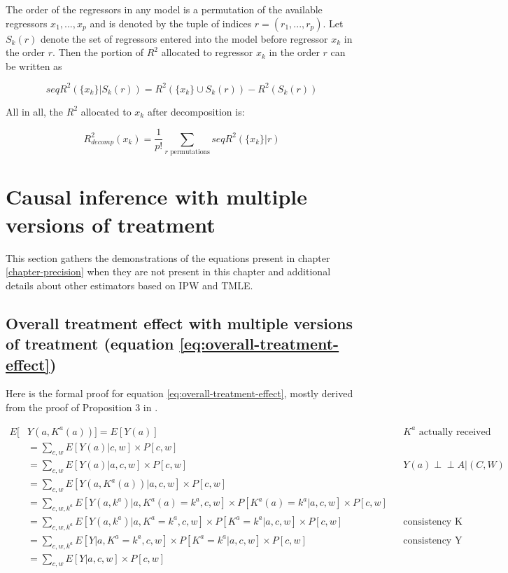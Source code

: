 \documentclass[a4paper,12pt,twoside,onecolumn,openright,final,oldfontcommands]{memoir}
\begin{document}
The order of the regressors in any model is a permutation of the
available regressors \(x_1, ..., x_p\) and is denoted by the tuple of
indices \(r = (r_1, ..., r_p)\). Let \(S_k(r)\) denote the set of
regressors entered into the model before regressor \(x_k\) in the order
\(r\). Then the portion of \(R^2\) allocated to regressor \(x_k\) in the
order \(r\) can be written as

\[seqR^2(\{x_k\}|S_k(r))=R^2(\{x_k\}\cup S_k(r))-R^2(S_k(r))\]

All in all, the \(R^2\) allocated to \(x_k\) after decomposition is:

\[R^2_{decomp}(x_k)=\dfrac{1}{p!}\sum_{r\text{ permutations}}seqR^2(\{x_k\}|r)\]

\section{Causal inference with multiple versions of
treatment}\label{causal-inference-with-multiple-versions-of-treatment}

This section gathers the demonstrations of the equations present in
chapter \ref{chapter-precision} when they are not present in this
chapter and additional details about other estimators based on IPW and
TMLE.

\subsection{Overall treatment effect with multiple versions of treatment
(equation
\eqref{eq:overall-treatment-effect})}\label{appendix-overall-treatment-effect}

Here is the formal proof for equation \eqref{eq:overall-treatment-effect},
mostly derived from the proof of Proposition 3 in
\citep{vanderweele2013causal}.

\begingroup
\footnotesize

\begin{equation*}
\begin{aligned}
  E[ & Y(a, K^a(a))] = E[Y(a)] &&K^a \text{ actually received}\\
                  & = \sum_{c,w} E[Y(a)|c,w] \times P[c,w]&& \\
                  & = \sum_{c,w} E[Y(a)|a,c,w] \times P[c,w]
                  && Y(a) \perp \!\!\! \perp A | (C,W)\\
                  & = \sum_{c,w} E[Y(a, K^a(a))|a,c,w] \times P[c,w]&& \\
                  & = \sum_{c,w,k^a} E[Y(a, k^a)|a,K^a(a)=k^a,c,w]\times P[K^a(a)=k^a|a,c,w] \times P[c,w] &&\\
                  & = \sum_{c,w,k^a} E[Y(a, k^a)|a,K^a=k^a,c,w]\times P[K^a=k^a|a,c,w] \times P[c,w]
                  &&\text{consistency K} \\
                  & = \sum_{c,w,k^a} E[Y|a,K^a=k^a,c,w]\times P[K^a=k^a|a,c,w] \times P[c,w]
                  &&\text{consistency Y} \\
                  & = \sum_{c,w} E[Y|a,c,w]\times P[c,w]
\end{aligned}
\end{equation*}
\end{document}
